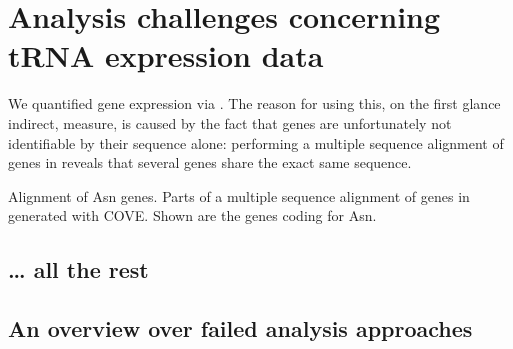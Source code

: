 \chapter{Analysis challenges concerning tRNA expression data}

We quantified \trna gene expression via  \chipseq. The reason for using
this, on the first glance indirect, measure, is caused by the fact that \trna
genes are unfortunately not identifiable by their sequence alone: performing a
multiple sequence alignment of \trna genes in \mmu reveals that several \trna
genes share the exact same sequence.

    {{\footnotesize}}
    {Alignment of Asn \trna genes.}
    {Parts of a multiple sequence alignment of \trna genes in \mmu generated
    with COVE\@. Shown are the \trna genes coding for Asn.}

\section{… all the rest}

\section{An overview over failed analysis approaches}
